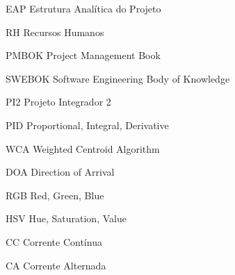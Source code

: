 \begin{siglas}
  \item[EAP] Estrutura Analítica do Projeto
  \item[RH] Recursos Humanos
  \item[PMBOK] Project Management Book
  \item[SWEBOK] Software Engineering Body of Knowledge
  \item[PI2] Projeto Integrador 2
  \item[PID] Proportional, Integral, Derivative
  \item[WCA] Weighted Centroid Algorithm
  \item[DOA] Direction of Arrival
  \item[RGB] Red, Green, Blue
  \item[HSV] Hue, Saturation, Value
  \item[CC] Corrente Contínua
  \item[CA] Corrente Alternada
\end{siglas}
